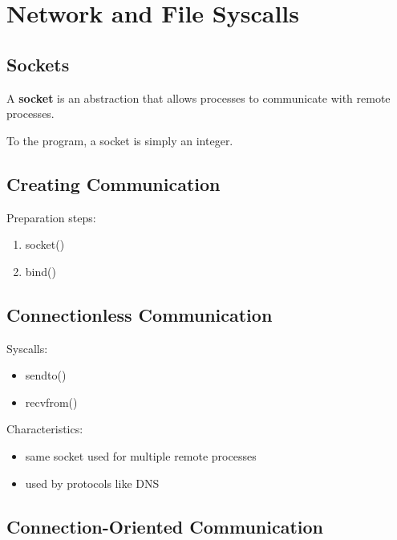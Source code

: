 
\section{Network and File Syscalls}

\subsection{Sockets}

A \textbf{socket} is an abstraction that allows processes to communicate with remote processes.

To the program, a socket is simply an integer.

\subsection{Creating Communication}

Preparation steps:

\begin{enumerate}
\item socket()
\item bind()
\end{enumerate}

\subsection{Connectionless Communication}

Syscalls:

\begin{itemize}
\item sendto()
\item recvfrom()
\end{itemize}

Characteristics:

\begin{itemize}
\item same socket used for multiple remote processes
\item used by protocols like DNS
\end{itemize}

\subsection{Connection-Oriented Communication}


